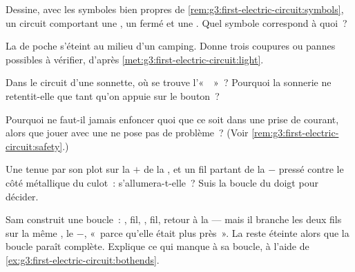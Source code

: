 \begin{exercise}[$\star$]\label{exo:g3:first-electric-circuit:5}
Dessine, avec les symboles bien propres de
\cref{rem:g3:first-electric-circuit:symbols}, un circuit comportant
une , un  fermé et une . Quel symbole
correspond à quoi~?
\end{exercise}

\begin{exercise}[$\star$]\label{exo:g3:first-electric-circuit:6}
La  de poche s'éteint au milieu d'un camping. Donne trois
coupures ou pannes possibles à vérifier, d'après
\cref{met:g3:first-electric-circuit:light}.
\end{exercise}

\begin{exercise}[$\star$]\label{exo:g3:first-electric-circuit:7}
Dans le circuit d'une sonnette, où se trouve l'«~~»~?
Pourquoi la sonnerie ne retentit-elle que tant qu'on appuie sur le
bouton~?
\end{exercise}

\begin{exercise}[$\star$]\label{exo:g3:first-electric-circuit:8}
Pourquoi ne faut-il jamais enfoncer quoi que ce soit dans une prise
de courant, alors que jouer avec une  ne pose pas de problème~?
(Voir \cref{rem:g3:first-electric-circuit:safety}.)
\end{exercise}

\begin{exercise}[$\star$]\label{exo:g3:first-electric-circuit:9}
Une  tenue par son plot sur la  $+$ de la , et un fil
partant de la  $-$ pressé contre le côté métallique du culot~:
s'allumera-t-elle~? Suis la boucle du doigt pour décider.
\end{exercise}

\begin{exercise}[$\star\star$]\label{exo:g3:first-electric-circuit:10}
Sam construit une boucle~: , fil, , fil, retour à la 
--- mais il branche les deux fils sur la même , le $-$, «~parce
qu'elle était plus près~». La  reste éteinte alors que la boucle
paraît complète. Explique ce qui manque à sa boucle, à l'aide de
\cref{ex:g3:first-electric-circuit:bothends}.
\end{exercise}

